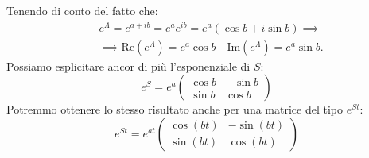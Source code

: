 Tenendo di conto del fatto che:
\[\begin{aligned}
    &e^\Lambda  = e^{a+ib}=e^ae^{ib}=e^a(\cos b + i \sin b) \implies \\
    & \implies  \text{Re}(e^\Lambda)=e^a \cos b \quad \text{Im}(e^\Lambda)=e^a\sin b
.\end{aligned}\]
Possiamo esplicitare ancor di più l'esponenziale di $S$:
\[
    e^S = e^a \begin{pmatrix} \cos b & - \sin b \\ \sin b & \cos b \end{pmatrix} 
\] 
Potremmo ottenere lo stesso risultato anche per una matrice del tipo $e^{St}$:
\[
    e^{St}=e^{at}\begin{pmatrix} \cos (bt) & - \sin (bt)\\ \sin (bt) & \cos (bt) \end{pmatrix} 
\] 
